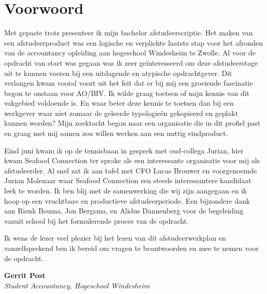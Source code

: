 \chapter*{Voorwoord} %
\thispagestyle{empty} %
\BgThispage %
Met gepaste trots presenteer ik mijn bachelor afstudeerscriptie. Het maken van een afstudeerproduct was een logische en verplichte laatste stap voor het afronden van de accountancy opleiding aan hogeschool Windesheim te Zwolle. Al voor de opdracht van start was gegaan was ik zeer geïnteresseerd om deze afstudeerstage uit te kunnen voeren bij een uitdagende en atypische opdrachtgever. Dit verlangen kwam vooral voort uit het feit dat er bij mij een groeiende fascinatie begon te onstaan voor AO/BIV. Ik wilde graag toetsen of mijn kennis van dit vakgebied voldoende is. En waar beter deze kennis te toetsen dan bij een werkgever waar niet zomaar de geleerde typologieën gekopieerd en geplakt kunnen worden?
Mijn zoektocht begon naar een organisatie die in dit profiel past en graag met mij samen zou willen werken aan een nuttig eindproduct.

Eind juni kwam ik op de tennisbaan in gesprek met oud-collega Jurian, hier kwam Seafood Connection ter sprake als een interessante organisatie voor mij als afstudeerder. Al snel zat ik aan tafel met CFO Lucas Brouwer en voorgenoemde Jurian Molenaar waar Seafood Connection een steeds interessantere kandidaat leek te worden. Ik ben blij met de samenwerking die wij zijn aangegaan en ik hoop op een vruchtbare en productieve afstudeerperiode. Een bijzondere dank aan Rienk Bouma, Jon Bergsma, en Alidus Dannenberg voor de begeleiding vanuit school bij het formulerende proces van de opdracht. 

Ik wens de lezer veel plezier bij het lezen van dit afstudeerwerkplan en vanzelfsprekend ben ik bereid om vragen te beantwoorden en mee te nemen voor de opdracht.

\bigskip
\noindent
\textbf{Gerrit Post} \\
\textit{Student Accountancy, Hogeschool Windesheim}